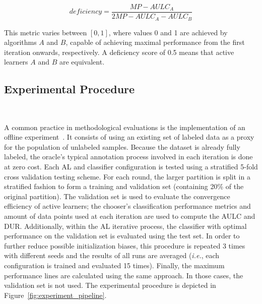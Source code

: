 \documentclass[parskip=full]{scrartcl}
\begin{document}
\begin{equation}
    deficiency = \frac{MP-AULC_A}{2MP-AULC_A-AULC_B} 
\end{equation}

This metric varies between $[0,1]$, where values 0 and 1 are achieved by
algorithms $A$ and $B$, capable of achieving maximal performance from the first
iteration onwards, respectively. A deficiency score of 0.5 means that active
learners $A$ and $B$ are equivalent.

\subsection{Experimental Procedure}~\label{sec:experimental_procedure}

A common practice in methodological evaluations is the implementation of an
offline experiment~\cite{Kagy2019}. It consists of using an existing set of
labeled data as a proxy for the population of unlabeled samples. Because the
dataset is already fully labeled, the oracle's typical annotation process
involved in each iteration is done at zero cost. Each AL and classifier
configuration is tested using a stratified 5-fold cross validation testing
scheme. For each round, the larger partition is split in a stratified fashion
to form a training and validation set (containing 20\% of the original
partition).  The validation set is used to evaluate the convergence efficiency
of active learners; the chooser's classification performance metrics and
amount of data points used at each iteration are used to compute the AULC and
DUR\@.  Additionally, within the AL iterative process, the classifier with
optimal performance on the validation set is evaluated using the test set. In
order to further reduce possible initialization biases, this procedure is
repeated 3 times with different seeds and the results of all runs are averaged
(\textit{i.e.}, each configuration is trained and evaluated 15 times).
Finally, the maximum performance lines are calculated using the same approach.
In those cases, the validation set is not used. The experimental procedure is
depicted in Figure~\ref{fig:experiment_pipeline}.
\end{document}
